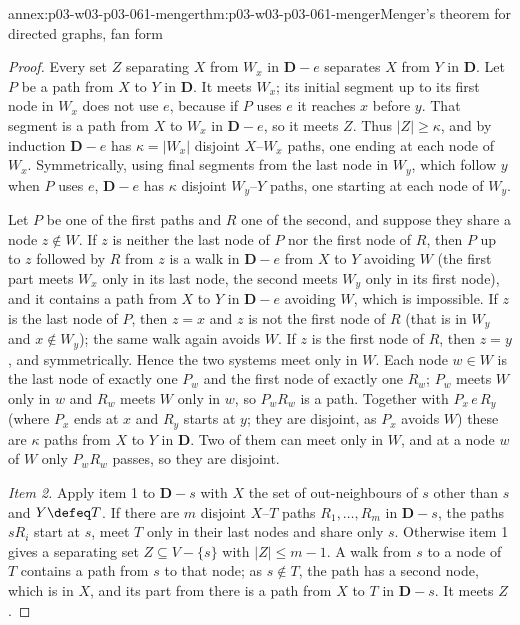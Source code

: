 \begin{annexitem}{annex:p03-w03-p03-061-menger}{thm:p03-w03-p03-061-menger}{Menger's theorem for directed graphs, fan form}
\begin{proof}
Every set \(Z\) separating \(X\) from \(W_x\) in \(\mathbf D-e\) separates
\(X\) from \(Y\) in \(\mathbf D\). Let \(P\) be a path from \(X\) to \(Y\) in
\(\mathbf D\). It meets \(W_x\); its initial segment up to its first node in
\(W_x\) does not use \(e\), because if \(P\) uses \(e\) it reaches \(x\)
before \(y\). That segment is a path from \(X\) to \(W_x\) in \(\mathbf D-e\),
so it meets \(Z\). Thus \(|Z|\ge\kappa\), and by induction \(\mathbf D-e\) has
\(\kappa=|W_x|\) disjoint \(X\)--\(W_x\) paths, one ending at each node of
\(W_x\). Symmetrically, using final segments from the last node in \(W_y\),
which follow \(y\) when \(P\) uses \(e\), \(\mathbf D-e\) has \(\kappa\)
disjoint \(W_y\)--\(Y\) paths, one starting at each node of \(W_y\).

Let \(P\) be one of the first paths and \(R\) one of the second, and suppose
they share a node \(z\notin W\). If \(z\) is neither the last node of \(P\)
nor the first node of \(R\), then \(P\) up to \(z\) followed by \(R\) from
\(z\) is a walk in \(\mathbf D-e\) from \(X\) to \(Y\) avoiding \(W\) (the
first part meets \(W_x\) only in its last node, the second meets \(W_y\) only
in its first node), and it contains a path from \(X\) to \(Y\) in \(\mathbf
D-e\) avoiding \(W\), which is impossible. If \(z\) is the last node of
\(P\), then \(z=x\) and \(z\) is not the first node of \(R\) (that is in
\(W_y\) and \(x\notin W_y\)); the same walk again avoids \(W\). If \(z\) is
the first node of \(R\), then \(z=y\), and symmetrically. Hence the two
systems meet only in \(W\). Each node \(w\in W\) is the last node of exactly
one \(P_w\) and the first node of exactly one \(R_w\); \(P_w\) meets \(W\)
only in \(w\) and \(R_w\) meets \(W\) only in \(w\), so \(P_wR_w\) is a path.
Together with \(P_x\,e\,R_y\) (where \(P_x\) ends at \(x\) and \(R_y\) starts
at \(y\); they are disjoint, as \(P_x\) avoids \(W\)) these are \(\kappa\)
paths from \(X\) to \(Y\) in \(\mathbf D\). Two of them can meet only in
\(W\), and at a node \(w\) of \(W\) only \(P_wR_w\) passes, so they are
disjoint.

\emph{Item 2.} Apply item 1 to \(\mathbf D-s\) with \(X\) the set of
out-neighbours of \(s\) other than \(s\) and \(Y\defeq T\). If there are \(m\)
disjoint \(X\)--\(T\) paths \(R_1,\ldots,R_m\) in \(\mathbf D-s\), the paths
\(sR_i\) start at \(s\), meet \(T\) only in their last nodes and share only
\(s\). Otherwise item 1 gives a separating set \(Z\subseteq V-\{s\}\) with
\(|Z|\le m-1\). A walk from \(s\) to a node of \(T\) contains a path from
\(s\) to that node; as \(s\notin T\), the path has a second node, which is in
\(X\), and its part from there is a path from \(X\) to \(T\) in \(\mathbf
D-s\). It meets \(Z\).
\end{proof}
\end{annexitem}

